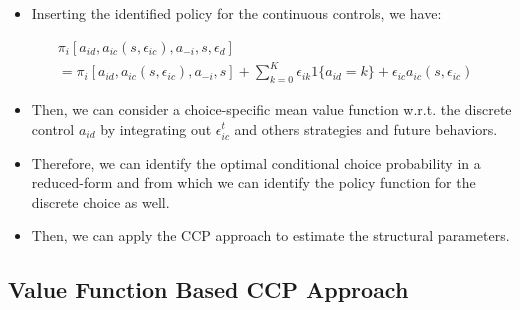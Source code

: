 \documentclass[]{book}
\providecommand{\tightlist}{%
  \setlength{\itemsep}{0pt}\setlength{\parskip}{0pt}}
\begin{document}
\begin{itemize}
\tightlist
\item
  Inserting the identified policy for the continuous controls, we have:
\end{itemize}

\begin{equation}
\begin{split}
&\pi_i[a_{id}, a_{ic}(s, \epsilon_{ic}), a_{-i}, s, \epsilon_{d}] \\
&= \pi_i[a_{id}, a_{ic}(s, \epsilon_{ic}), a_{-i}, s] +\sum_{k = 0}^K \epsilon_{ik}1\{a_{id} = k\} + \epsilon_{ic} a_{ic}(s, \epsilon_{ic})
\end{split}
\end{equation}

\begin{itemize}
\tightlist
\item
  Then, we can consider a choice-specific mean value function w.r.t. the
  discrete control \(a_{id}\) by integrating out \(\epsilon_{ic}^t\) and
  others strategies and future behaviors.
\item
  Therefore, we can identify the optimal conditional choice probability
  in a reduced-form and from which we can identify the policy function
  for the discrete choice as well.
\item
  Then, we can apply the CCP approach to estimate the structural
  parameters.
\end{itemize}

\subsection{Value Function Based CCP
Approach}\label{value-function-based-ccp-approach}
\end{document}
